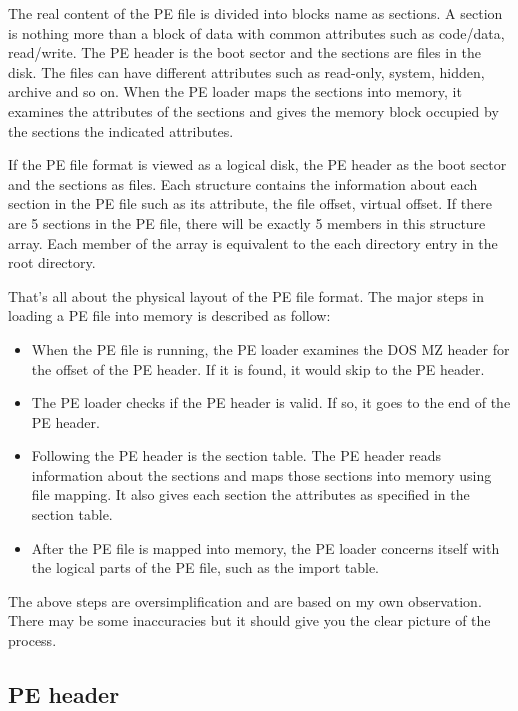The real content of the PE file is divided into blocks name as sections. A section is nothing more than a block of data with common attributes such as code/data, read/write. The PE header is the boot sector and the sections are files in the disk. The files can have different attributes such as read-only, system, hidden, archive and so on. When the PE loader maps the sections into memory, it examines the attributes of the sections and gives the memory block occupied by the sections the indicated attributes.

If the PE file format is viewed as a logical disk, the PE header as the boot sector and the sections as files. Each structure contains the information about each section in the PE file such as its attribute, the file offset, virtual offset. If there are 5 sections in the PE file, there will be exactly 5 members in this structure array. Each member of the array is equivalent to the each directory entry in the root directory.

That's all about the physical layout of the PE file format. The major steps in loading a PE file into memory is described as follow:

\begin{itemize}
\item When the PE file is running, the PE loader examines the DOS MZ header for the offset of the PE header. If it is found, it would skip to the PE header.
\item The PE loader checks if the PE header is valid. If so, it goes to the end of the PE header.
\item Following the PE header is the section table. The PE header reads information about the sections and maps those sections into memory using file mapping. It also gives each section the attributes as specified in the section table.
\item After the PE file is mapped into memory, the PE loader concerns itself with the logical parts of the PE file, such as the import table.
\end{itemize}

The above steps are oversimplification and are based on my own observation. There may be some inaccuracies but it should give you the clear picture of the process.
\subsection{PE header}


